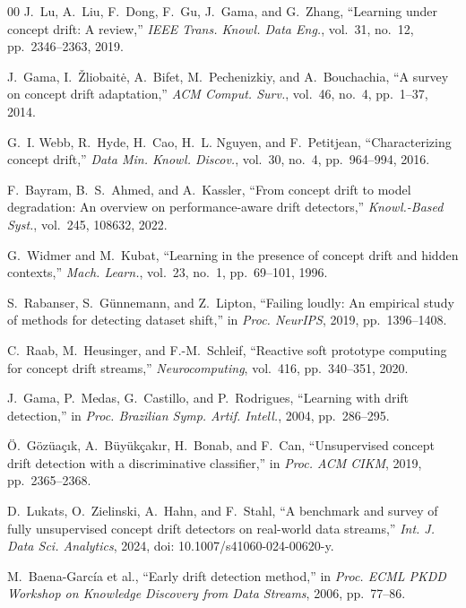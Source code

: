 \documentclass[conference,a4paper]{IEEEtran}
\begin{document}
{\scriptsize
\begin{thebibliography}{00}
 J.~Lu, A.~Liu, F.~Dong, F.~Gu, J.~Gama, and G.~Zhang, ``Learning under concept drift: A review,'' \textit{IEEE Trans. Knowl. Data Eng.}, vol.~31, no.~12, pp.~2346--2363, 2019.

 J.~Gama, I.~\v{Z}liobait\.{e}, A.~Bifet, M.~Pechenizkiy, and A.~Bouchachia, ``A survey on concept drift adaptation,'' \textit{ACM Comput. Surv.}, vol.~46, no.~4, pp.~1--37, 2014.

 G.~I. Webb, R.~Hyde, H.~Cao, H.~L. Nguyen, and F.~Petitjean, ``Characterizing concept drift,'' \textit{Data Min. Knowl. Discov.}, vol.~30, no.~4, pp.~964--994, 2016.

 F.~Bayram, B.~S.~Ahmed, and A.~Kassler, ``From concept drift to model degradation: An overview on performance-aware drift detectors,'' \textit{Knowl.-Based Syst.}, vol.~245, 108632, 2022.

 G.~Widmer and M.~Kubat, ``Learning in the presence of concept drift and hidden contexts,'' \textit{Mach. Learn.}, vol.~23, no.~1, pp.~69--101, 1996.

 S.~Rabanser, S.~G\"{u}nnemann, and Z.~Lipton, ``Failing loudly: An empirical study of methods for detecting dataset shift,'' in \textit{Proc. NeurIPS}, 2019, pp.~1396--1408.

 C.~Raab, M.~Heusinger, and F.-M.~Schleif, ``Reactive soft prototype computing for concept drift streams,'' \textit{Neurocomputing}, vol.~416, pp.~340--351, 2020.

 J.~Gama, P.~Medas, G.~Castillo, and P.~Rodrigues, ``Learning with drift detection,'' in \textit{Proc. Brazilian Symp. Artif. Intell.}, 2004, pp.~286--295.

 \"{O}.~G\"{o}z\"{u}a\c{c}{\i}k, A.~B\"{u}y\"{u}k\c{c}ak{\i}r, H.~Bonab, and F.~Can, ``Unsupervised concept drift detection with a discriminative classifier,'' in \textit{Proc. ACM CIKM}, 2019, pp.~2365--2368.

 D.~Lukats, O.~Zielinski, A.~Hahn, and F.~Stahl, ``A benchmark and survey of fully unsupervised concept drift detectors on real-world data streams,'' \textit{Int. J. Data Sci. Analytics}, 2024, doi: 10.1007/s41060-024-00620-y.

 M.~Baena-Garc\'{i}a et al., ``Early drift detection method,'' in \textit{Proc. ECML PKDD Workshop on Knowledge Discovery from Data Streams}, 2006, pp.~77--86.


\end{thebibliography}}
\end{document}
